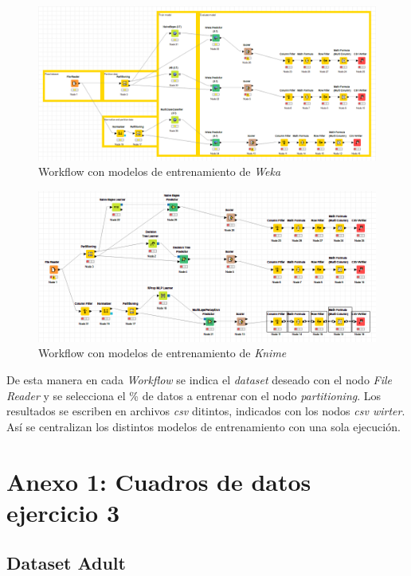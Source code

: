 \documentclass[10pt,a4paper]{article}
\begin{document}
\begin{figure}[h!]
	\centering
	\includegraphics[scale=0.5]{images/workflow_ej3_weka.png}
	\caption{Workflow con modelos de entrenamiento de \textit{Weka}}
	\label{fig:workflow_weka}
\end{figure}

\begin{figure}[h!]
	\centering
	\includegraphics[scale=0.5]{images/workflow_ej3_knime.png}
	\caption{Workflow con modelos de entrenamiento de \textit{Knime}}
	\label{fig:workflow_knime}
\end{figure}

De esta manera en cada \textit{Workflow} se indica el \textit{dataset} deseado con el nodo \textit{File Reader} y se selecciona el \% de datos a entrenar con el nodo \textit{partitioning}. Los resultados se escriben en archivos \textit{csv} ditintos, indicados con los nodos \textit{csv wirter}. Así se centralizan los distintos modelos de entrenamiento con una sola ejecución.


\newpage
\section{Anexo 1: Cuadros de datos ejercicio 3}

\subsection{Dataset Adult}
\end{document}
